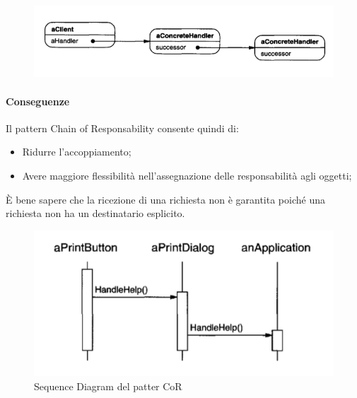 \begin{figure}[H]
    \centering
    \includegraphics[width=0.5\linewidth]{assets/pattern/chain-of-responsability/cor-object-diagram.png}
\end{figure}

\paragraph{Conseguenze} Il pattern Chain of Responsability consente quindi di:
\begin{itemize}
    \item Ridurre l'accoppiamento;
    \item Avere maggiore flessibilità nell'assegnazione delle responsabilità agli oggetti;
\end{itemize}

È bene sapere che la ricezione di una richiesta non è garantita poiché una richiesta non ha un destinatario esplicito.

\begin{figure}[H]
    \centering
    \includegraphics[width=0.75\linewidth]{assets/pattern/chain-of-responsability/cor-sequence.png}
    \caption{Sequence Diagram del patter CoR}
\end{figure}

\newpage